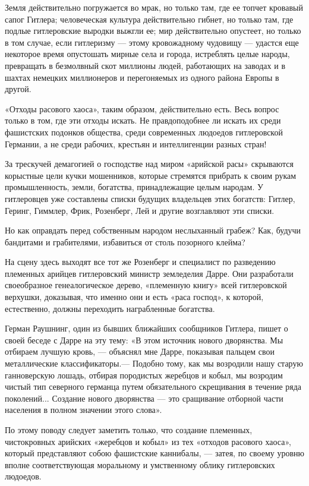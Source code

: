 \documentclass[12pt, a4paper, openany]{book}
\begin{document}
Земля действительно погружается во мрак, но только там, где ее топчет кровавый сапог Гитлера; человеческая культура действительно гибнет, но только там, где подлые гитлеровские выродки выжгли ее; мир действительно опустеет, но только в том случае, если гитлеризму — этому кровожадному чудовищу — удастся еще некоторое время опустошать мирные села и города, истреблять целые народы, превращать в безмолвный скот миллионы людей, работающих на заводах и в шахтах немецких миллионеров и перегоняемых из одного района Европы в другой.

«Отходы расового хаоса», таким образом, действительно есть. Весь вопрос только в том, где эти отходы искать. Не правдоподобнее ли искать их среди фашистских подонков общества, среди современных людоедов гитлеровской Германии, а не среди рабочих, крестьян и интеллигенции разных стран!

За трескучей демагогией о господстве над миром «арийской расы» скрываются корыстные цели кучки мошенников, которые стремятся прибрать к своим рукам промышленность, земли, богатства, принадлежащие целым народам. У гитлеровцев уже составлены списки будущих владельцев этих богатств: Гитлер, Геринг, Гиммлер, Фрик, Розенберг, Лей и другие возглавляют эти списки.

Но как оправдать перед собственным народом неслыханный грабеж? Как, будучи бандитами и грабителями, избавиться от столь позорного клейма?

На сцену здесь выходят все тот же Розенберг и специалист по разведению племенных арийцев гитлеровский министр земледелия Дарре. Они разработали своеобразное генеалогическое дерево, «племенную книгу» всей гитлеровской верхушки, доказывая, что именно они и есть «раса господ», к которой, естественно, должны переходить награбленные богатства.

Герман Раушнинг, один из бывших ближайших сообщников Гитлера, пишет о своей беседе с Дарре на эту тему: «В этом источник нового дворянства. Мы отбираем лучшую кровь, — объяснял мне Дарре, показывая пальцем свои металлические классификаторы.— Подобно тому, как мы возродили нашу старую ганноверскую лошадь, отбирая породистых жеребцов и кобыл, мы возродим чистый тип северного германца путем обязательного скрещивания в течение ряда поколений... Создание нового дворянства — это сращивание отборной части населения в полном значении этого слова».

По этому поводу следует заметить только, что создание племенных, чистокровных арийских «жеребцов и кобыл» из тех «отходов расового хаоса», который представляют собою фашистские каннибалы, — затея, по своему уровню вполне соответствующая моральному и умственному облику гитлеровских людоедов.
\end{document}
